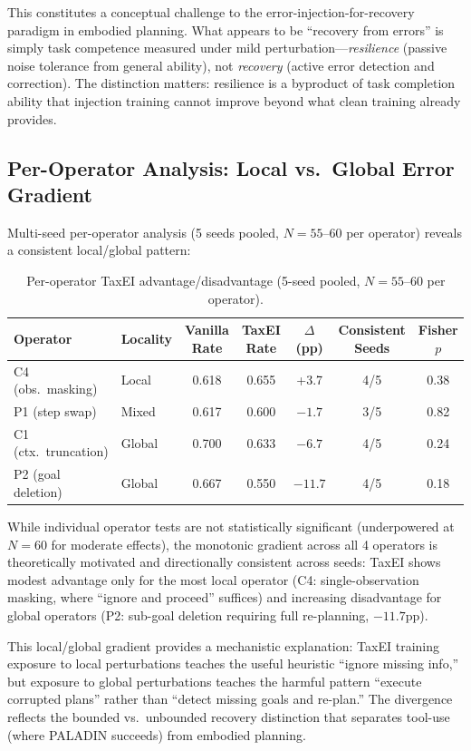 \documentclass[11pt,a4paper]{article}
\begin{document}
This constitutes a conceptual challenge to the error-injection-for-recovery paradigm in embodied planning. What appears to be ``recovery from errors'' is simply task competence measured under mild perturbation---\emph{resilience} (passive noise tolerance from general ability), not \emph{recovery} (active error detection and correction). The distinction matters: resilience is a byproduct of task completion ability that injection training cannot improve beyond what clean training already provides.

\subsection{Per-Operator Analysis: Local vs.\ Global Error Gradient}
\label{sec:peroperator}

Multi-seed per-operator analysis (5 seeds pooled, $N=55$--60 per operator) reveals a consistent local/global pattern:

\begin{table}[h]
\centering
\caption{Per-operator TaxEI advantage/disadvantage (5-seed pooled, $N=55$--60 per operator).}
\label{tab:peroperator}
\begin{tabular}{llccccc}
\toprule
Operator & Locality & Vanilla Rate & TaxEI Rate & $\Delta$ (pp) & Consistent Seeds & Fisher $p$ \\
\midrule
C4 (obs.\ masking) & Local & 0.618 & 0.655 & +3.7 & 4/5 & 0.38 \\
P1 (step swap) & Mixed & 0.617 & 0.600 & $-1.7$ & 3/5 & 0.82 \\
C1 (ctx.\ truncation) & Global & 0.700 & 0.633 & $-6.7$ & 4/5 & 0.24 \\
P2 (goal deletion) & Global & 0.667 & 0.550 & $-11.7$ & 4/5 & 0.18 \\
\bottomrule
\end{tabular}
\end{table}

While individual operator tests are not statistically significant (underpowered at $N=60$ for moderate effects), the monotonic gradient across all 4 operators is theoretically motivated and directionally consistent across seeds: TaxEI shows modest advantage only for the most local operator (C4: single-observation masking, where ``ignore and proceed'' suffices) and increasing disadvantage for global operators (P2: sub-goal deletion requiring full re-planning, $-11.7$pp).

This local/global gradient provides a mechanistic explanation: TaxEI training exposure to local perturbations teaches the useful heuristic ``ignore missing info,'' but exposure to global perturbations teaches the harmful pattern ``execute corrupted plans'' rather than ``detect missing goals and re-plan.'' The divergence reflects the bounded vs.\ unbounded recovery distinction that separates tool-use (where PALADIN succeeds) from embodied planning.
\end{document}
